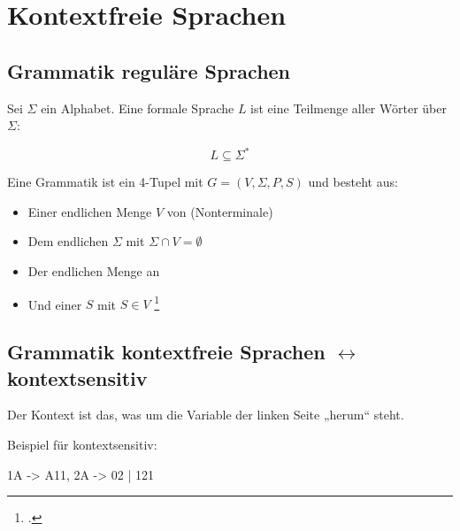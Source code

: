 \documentclass{lehramt-informatik-haupt}
\begin{document}

\chapter{Kontextfreie Sprachen}

\section{Grammatik reguläre Sprachen}

Sei $\Sigma$ ein Alphabet. Eine formale Sprache $L$ ist eine Teilmenge
aller Wörter über $\Sigma$:

\begin{displaymath}
L \subseteq \Sigma^*
\end{displaymath}

\bigskip

\noindent
Eine Grammatik ist ein 4-Tupel mit $G = (V, \Sigma, P, S)$ und besteht aus:

\begin{itemize}
\item Einer endlichen Menge $V$ von  (Nonterminale)

\item Dem endlichen  $\Sigma$ mit $\Sigma \cap V
= \emptyset$

\item Der endlichen Menge an 

\item Und einer  $S$ mit $S \in V$
\footcite[Seite 7]{theo:fs:2}
\end{itemize}

%

\section{Grammatik kontextfreie Sprachen $\leftrightarrow$ kontextsensitiv}

Der Kontext ist das, was um die Variable der linken Seite „herum“
steht.

Beispiel für kontextsensitiv:

\begin{liProduktionsRegeln}
1A -> A11,
2A -> 02 | 121
\end{liProduktionsRegeln}
\end{document}
